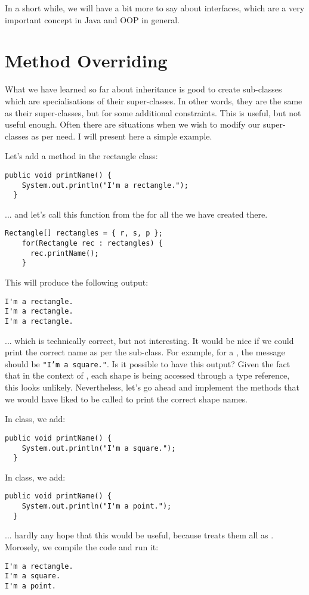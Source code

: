 \documentclass[12pt,a4paper]{article}
\begin{document}
In a short while, we will have a bit more to say about interfaces, which are a very important concept in Java and OOP in general.

\section{Method Overriding}
What we have learned so far about inheritance is good to create sub-classes which are specialisations of their super-classes. In other words, they are the same as their super-classes, but for some additional constraints. This is useful, but not useful enough. Often there are situations when we wish to modify our super-classes as per need. I will present here a simple example.

Let's add a method \lstinline@printName@ in the rectangle class:
\begin{lstlisting}[frame=single]
  public void printName() {
    System.out.println("I'm a rectangle.");
  }
\end{lstlisting}

... and let's call this function from the \lstinline@main@ for all the \lstinline@Rectangle@s we have created there.
\begin{lstlisting}[frame=single]
    Rectangle[] rectangles = { r, s, p };
    for(Rectangle rec : rectangles) {
      rec.printName();
    }
\end{lstlisting}
This will produce the following output:
\begin{lstlisting}[frame=single]
I'm a rectangle.
I'm a rectangle.
I'm a rectangle.
\end{lstlisting}

... which is technically correct, but not interesting. It would be nice if we could print the correct name as per the sub-class. For example, for a \lstinline@Square@, the message should be \texttt{"I'm a square."}. Is it possible to have this output? Given the fact that in the context of \lstinline@main@, each shape is being accessed through a \lstinline@Rectangle@ type reference, this looks unlikely. Nevertheless, let's go ahead and implement the methods that we would have liked to be called to print the correct shape names.

In \lstinline@Square@ class, we add:
\begin{lstlisting}[frame=single]
  public void printName() {
    System.out.println("I'm a square.");
  }
\end{lstlisting}

In \lstinline@Point@ class, we add:
\begin{lstlisting}[frame=single]
  public void printName() {
    System.out.println("I'm a point.");
  }
\end{lstlisting}
... hardly any hope that this would be useful, because \lstinline@main@ treats them all as \lstinline@Rectangle@s. Morosely, we compile the code and run it:
\begin{lstlisting}[frame=single]
I'm a rectangle.
I'm a square.
I'm a point.
\end{lstlisting}
\end{document}
